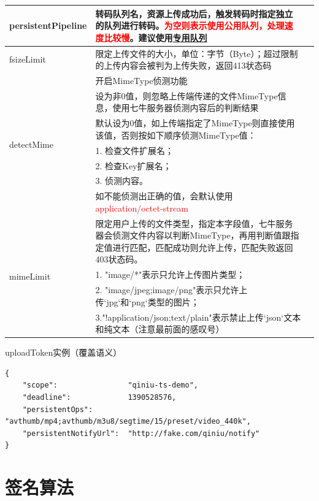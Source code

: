 \documentclass[11pt, oneside]{book}
\begin{document}
\begin{center}
{\begin{longtable}{|m{12em}<{\centering}|p{25em}|p{8em}|}
persistentPipeline & 转码队列名，资源上传成功后，触发转码时指定独立的队列进行转码。\textcolor{red}{为空则表示使用公用队列，处理速度比较慢}。建议使用\href{https://portal.qiniu.com/mps/pipeline}{专用队列} & \\
\hline
fsizeLimit & 限定上传文件的大小，单位：字节（Byte）；超过限制的上传内容会被判为上传失败，返回413状态码 &  \\
\hline
\multirow{7}{*}{detectMime} & 开启MimeType侦测功能 & \\ 
 	& 设为非0值，则忽略上传端传递的文件MimeType信息，使用七牛服务器侦测内容后的判断结果 & \\ 
	& 默认设为0值，如上传端指定了MimeType则直接使用该值，否则按如下顺序侦测MimeType值：& \\  
	& 1. 检查文件扩展名；& \\ 
	& 2. 检查Key扩展名；& \\ 
	& 3. 侦测内容。& \\  
	& 如不能侦测出正确的值，会默认使用 \textcolor{red}{application/octet-stream} &  \\
\hline
\multirow{4}{*}{mimeLimit} & 限定用户上传的文件类型，指定本字段值，七牛服务器会侦测文件内容以判断MimeType，再用判断值跟指定值进行匹配，匹配成功则允许上传，匹配失败返回403状态码。& \\ 
	& 1. "image/*"表示只允许上传图片类型；& \\ 
	& 2. "image/jpeg;image/png"表示只允许上传`jpg`和`png`类型的图片；& \\ 
	& 3."!application/json;text/plain"表示禁止上传`json`文本和纯文本（注意最前面的感叹号）& \\
\hline 
\end{longtable}
}
\end{center}

\begin{sample}
  \caption{uploadToken实例（覆盖语义）}
\begin{lstlisting}
{
    "scope":                "qiniu-ts-demo",
    "deadline":             1390528576,
    "persistentOps":        "avthumb/mp4;avthumb/m3u8/segtime/15/preset/video_440k",
    "persistentNotifyUrl":  "http://fake.com/qiniu/notify"
}
\end{lstlisting}

  \label{uploadToken-overwrite}
\end{sample}

\clearpage

\section{签名算法}
\end{document}
